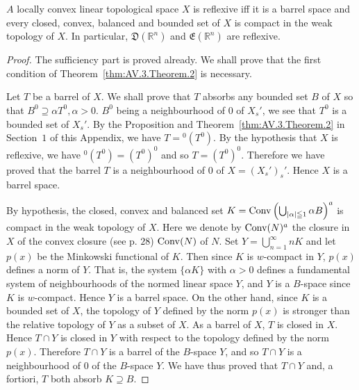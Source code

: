 \begin{theorem}\label{thm:AV.3.Theorem.2} $A$ locally convex linear topological space $X$ is reflexive iff it is a barrel space and every closed, convex, balanced and bounded set of $X$ is compact in the weak topology of $X$. In particular, $\mathfrak{D}(\mathbb{R}^{n})$ and $\mathfrak{E}(\mathbb{R}^{n})$ are reflexive. 
\end{theorem}

\begin{proof}
 The sufficiency part is proved already. We shall prove that the first condition of Theorem~\ref{thm:AV.3.Theorem.2} is necessary. 

Let $T$ be a barrel of $X$. We shall prove that $T$ absorbs any bounded set $B$ of $X$ so that $B^0 \supseteq \alpha T^0, \alpha > 0$. $B^0$ being a neighbourhood of $0$ of $X_s'$, we see that $T^0$ is a bounded set of $X_s'$. By the Proposition and Theorem~\ref{thm:AV.3.Theorem.2} in Section~\hyperref[sec:AV.1]{$1$} of this Appendix, we have $T = {}^0(T^0)$. By the hypothesis that $X$ is reflexive, we have ${}^0(T^0) = (T^0)^0$ and so $T = (T^0)^0$. Therefore we have proved that the barrel $T$ is a neighbourhood of $0$ of $X = (X_s')_s'$. Hence $X$ is a barrel space. 

By hypothesis, the closed, convex and balanced set $K = \operatorname{Conv}\left(\bigcup\nolimits_{|\alpha| \leqq 1} \alpha B\right)^a$ 
is compact in the weak topology of $X$. Here we denote by $\operatorname{Conv}(N)^a$ the closure in $X$ of the convex closure (see p. $28$) $\operatorname{Conv}(N)$ of $N$. Set $Y = \bigcup\limits_{n=1}^{\infty} nK$ and let $p(x)$ be the Minkowski functional of $K$. Then since $K$ is $w$-compact in $Y$, $p(x)$ defines a norm of $Y$. That is, the system $\{\alpha K\}$ with $\alpha > 0$ defines a fundamental system of neighbourhoods of the normed linear space $Y$, and $Y$ is a $B$-space since $K$ is $w$-compact. Hence $Y$ is a barrel space. On the other hand, since $K$ is a bounded set of $X$, the topology of $Y$ defined by the norm $p(x)$ is stronger than the relative topology of $Y$ as a subset of $X$. As a barrel of $X$, $T$ is closed in $X$. Hence $T \cap Y$ is closed in $Y$ with respect to the topology defined by the norm $p(x)$. Therefore $T \cap Y$ is a barrel of the $B$-space $Y$, and so $T \cap Y$ is a neighbourhood of $0$ of the $B$-space $Y$. We have thus proved that $T \cap Y$ and, a fortiori, $T$ both absorb $K \supseteq B$. 
\end{proof}


\label{sec:AV.4}


